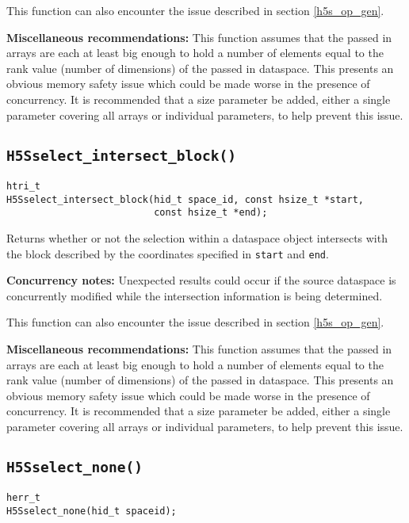 \documentclass[../HDF5_RFC.tex]{subfiles}
\begin{document}
This function can also encounter the issue described in section \ref{h5s_op_gen}.

\textbf{Miscellaneous recommendations:} This function assumes that the passed in arrays are
each at least big enough to hold a number of elements equal to the rank value (number of
dimensions) of the passed in dataspace. This presents an obvious memory safety issue which
could be made worse in the presence of concurrency. It is recommended that a size parameter
be added, either a single parameter covering all arrays or individual parameters, to help
prevent this issue.

\subsection{\texttt{H5Sselect\_intersect\_block()}}
\label{apdx:h5s_func_h5sselect_intersect_block}

\begin{verbatim}
htri_t
H5Sselect_intersect_block(hid_t space_id, const hsize_t *start,
                          const hsize_t *end);
\end{verbatim}

Returns whether or not the selection within a dataspace object intersects with the block described by
the coordinates specified in \texttt{start} and \texttt{end}.

\textbf{Concurrency notes:} Unexpected results could occur if the source dataspace is concurrently
modified while the intersection information is being determined.

This function can also encounter the issue described in section \ref{h5s_op_gen}.

\textbf{Miscellaneous recommendations:} This function assumes that the passed in arrays are
each at least big enough to hold a number of elements equal to the rank value (number of
dimensions) of the passed in dataspace. This presents an obvious memory safety issue which
could be made worse in the presence of concurrency. It is recommended that a size parameter
be added, either a single parameter covering all arrays or individual parameters, to help
prevent this issue.

\subsection{\texttt{H5Sselect\_none()}}
\label{apdx:h5s_func_h5sselect_none}

\begin{verbatim}
herr_t
H5Sselect_none(hid_t spaceid);
\end{verbatim}
\end{document}
